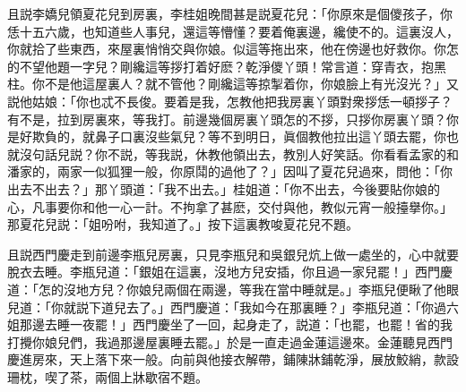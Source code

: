 且説李嬌兒領夏花兒到房裏，李桂姐晚間甚是説夏花兒：「你原來是個儍孩子，你恁十五六歲，也知道些人事兒，還這等懵懂？要着俺裏邊，纔使不的。這裏沒人，你就拾了些東西，來屋裏悄悄交與你娘。似這等拖出來，他在傍邊也好救你。你怎的不望他題一字兒？剛纔這等拶打着好麽？乾淨儍丫頭！常言道：穿青衣，抱黑柱。你不是他這屋裏人？就不管他？剛纔這等掠掣着你，你娘臉上有光沒光？」又説他姑娘：「你也忒不長俊。要着是我，怎教他把我房裏丫頭對衆拶恁一頓拶子？有不是，拉到房裏來，等我打。前邊幾個房裏丫頭怎的不拶，只拶你房裏丫頭？你是好欺負的，就鼻子口裏沒些氣兒？等不到明日，眞個教他拉出這丫頭去罷，你也就沒句話兒説？你不説，等我説，休教他領出去，教別人好笑話。你看看孟家的和潘家的，兩家一似狐狸一般，你原鬦的過他了？」因叫了夏花兒過來，問他：「你出去不出去？」那丫頭道：「我不出去。」桂姐道：「你不出去，今後要貼你娘的心，凡事要你和他一心一計。不拘拿了甚麽，交付與他，教似元宵一般擡擧你。」那夏花兒説：「姐吩咐，我知道了。」按下這裏教唆夏花兒不題。

且説西門慶走到前邊李瓶兒房裏，只見李瓶兒和吳銀兒炕上做一處坐的，心中就要脫衣去睡。李瓶兒道：「銀姐在這裏，沒地方兒安插，你且過一家兒罷！」西門慶道：「怎的沒地方兒？你娘兒兩個在兩邊，等我在當中睡就是。」李瓶兒便瞅了他眼兒道：「你就説下道兒去了。」西門慶道：「我如今在那裏睡？」李瓶兒道：「你過六姐那邊去睡一夜罷！」西門慶坐了一回，起身走了，説道：「也罷，也罷！省的我打攪你娘兒們，我過那邊屋裏睡去罷。」於是一直走過金蓮這邊來。金蓮聽見西門慶進房來，天上落下來一般。向前與他接衣解帶，鋪陳牀鋪乾淨，展放鮫綃，款設珊枕，喫了茶，兩個上牀歇宿不題。

